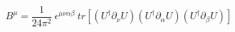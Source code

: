 \begin{equation}
B^\mu= \frac{1}{24\pi^2}~ \epsilon^{\mu\nu\alpha\beta}~tr[(U^\dag \partial_\nu U)(U^\dag \partial_\alpha U)(U^\dag \partial_\beta U)]
\end{equation}

